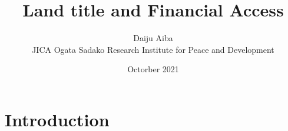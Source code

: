 \documentclass[a4j,12pt]{article}
\title{Land title and Financial Access}
\author{Daiju Aiba \\
        \small JICA Ogata Sadako Research Institute for Peace and Development
}
\date{Octorber 2021}
\begin{document}
\maketitle

\section{Introduction}
\end{document}
